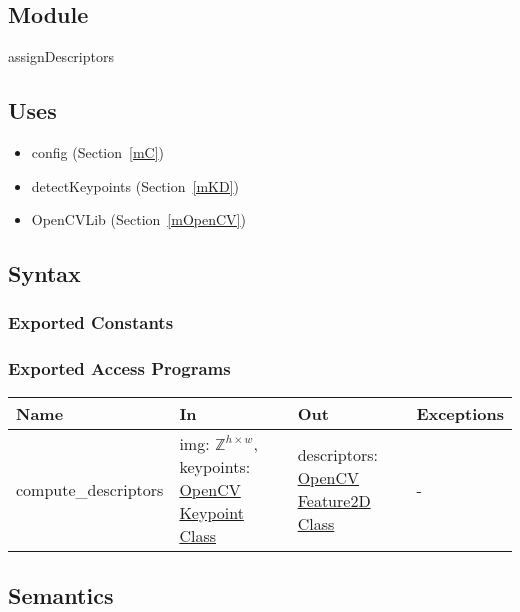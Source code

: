 \documentclass[12pt, titlepage]{article}
\begin{document}


\subsection{Module}

assignDescriptors

\subsection{Uses}
\begin{itemize}
  \item config (Section~\ref{mC})
  \item detectKeypoints (Section~\ref{mKD})
  \item OpenCVLib (Section~\ref{mOpenCV})
\end{itemize}

\subsection{Syntax}

\subsubsection{Exported Constants}

\subsubsection{Exported Access Programs}

\begin{center}
\begin{tabular}{p{4cm} p{5cm} p{4cm} p{2cm}}
\hline
\textbf{Name} & \textbf{In} & \textbf{Out} & \textbf{Exceptions} \\
\hline
compute\_descriptors
& img: $\mathbb{Z}^{h \times w}$, \newline
keypoints: \href{https://docs.opencv.org/3.4/d2/d29/classcv_1_1KeyPoint.html}{OpenCV Keypoint Class}
& descriptors: \href{https://docs.opencv.org/4.x/d0/d13/classcv_1_1Feature2D.html}{OpenCV Feature2D Class}
& - \\
\hline
\end{tabular}
\end{center}

\subsection{Semantics}
\end{document}
